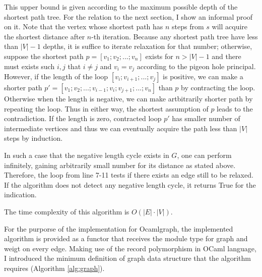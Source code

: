 \documentclass[a4paper,12pt]{article}
\begin{document}
This upper bound is given according to the maximum possible depth of
the shortest path tree. For the relation to the next section, I show
an informal proof on it. Note that the vertex whose shortest path has
$n$ steps from $s$ will acquire the shortest distance after $n$-th
iteration. Because any shortest path tree have less than $|V|-1$
depths, it is suffice to iterate relaxation for that number;
otherwise, suppose the shortest path $p=[v_1;v_2;...;v_n]$ exists for
$n>|V|-1$ and there must exists such $i,j$ that $i\ne j$ and $v_i=v_j$
according to the pigeon hole principal. However, if the length of the
loop $[v_i;v_{i+1};...;v_j]$ is positive, we can make a shorter path
$p'=[v_1;v_2;...;v_{i-1};v_i;v_{j+1};...;v_n]$ than $p$ by contracting
the loop. Otherwise when the length is negative, we can make
artbitrarily shorter path by repeating the loop. Thus in either way,
the shortest assumption of $p$ leads to the contradiction. If the
length is zero, contracted loop $p'$ has smaller number of
intermediate vertices and thus we can eventually acquire the path less
than $|V|$ steps by induction.

In such a case that the negative length cycle exists in $G$, one can
perform \relaxBF infinitely, gaining arbitrarily small number for its
distance as stated above. Therefore, the loop from line 7-11 tests if
there exists an edge still to be relaxed. If the algorithm does not
detect any negative length cycle, it returns True for the indication.

The time complexity of this algorithm is $O(|E|\cdot|V|)$.

\newcommand{\mainBF}{\ensuremath{\mbox{\sc Bellman-Ford}}}
\begin{algorithm}
\caption{$\mainBF(G,s,l)$}\label{alg:bf}
\begin{algorithmic}[1]
\ENDFOR
\ENDFOR
{}
\ENDIF
\ENDFOR
{}
\end{algorithmic}
\end{algorithm}

For the purporse of the implementation for Ocamlgraph, the implemented
algorithm is provided as a functor that receives the module type for
graph and weigt on every edge. Making use of the record polymorphism
in OCaml language, I introduced the minimum definition of graph data
structure that the algorithm requires (Algorithm \ref{alg:graph}).
\end{document}
